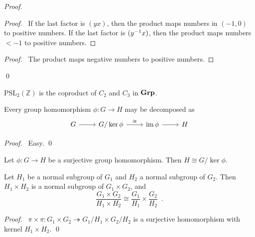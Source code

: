 \begin{proof}
\begin{proof}
	\pf\ If the last factor is $(yx)$, then the product maps numbers in $(-1,0)$ to positive numbers. If the last factor is $({y}^{-1}x)$, then the product maps numbers $< -1$ to positive numbers.
\end{proof}
\begin{proof}
	\pf\ The product maps negative numbers to positive numbers.
\end{proof}
\qed
\end{proof}

\begin{cor}
$\mathrm{PSL}_2(\mathbb{Z})$ is the coproduct of $C_2$ and $C_3$ in $\mathbf{Grp}$.
\end{cor}

\begin{thm}
Every group homomorphism $\phi : G \rightarrow H$ may be decomposed as
\[ \begin{tikzcd}
G \arrow[r] & G / \ker \phi \arrow[r,"\cong"] & \im \phi \arrow[r] & H 
\end{tikzcd} \]
\end{thm}

\begin{proof}
\pf\ Easy. \qed
\end{proof}

\begin{cor}
Let $\phi : G \rightarrow H$ be a surjective group homomorphism. Then $H \cong G / \ker \phi$.
\end{cor}

\begin{prop}
Let $H_1$ be a normal subgroup of $G_1$ and $H_2$ a normal subgroup of $G_2$. Then $H_1 \times H_2$ is a normal subgroup of $G_1 \times G_2$, and
\[ \frac{G_1 \times G_2}{H_1 \times H_2} \cong \frac{G_1}{H_1} \times \frac{G_2}{H_2} \enspace . \]
\end{prop}

\begin{proof}
\pf\ $\pi \times \pi : G_1 \times G_2 \twoheadrightarrow G_1 / H_1 \times G_2 / H_2$ is a surjective homomorphism with kernel $H_1 \times H_2$. \qed
\end{proof}


